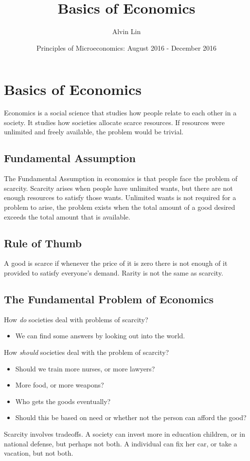 \documentclass[letterpaper, 12pt]{article}
\title{Basics of Economics}
\author{Alvin Lin}
\date{Principles of Microeconomics: August 2016 - December 2016}
\begin{document}
\maketitle

\section*{Basics of Economics}
Economics is a social science that studies how people relate to each other in
a society. It studies how societies allocate scarce resources. If resources were
unlimited and freely available, the problem would be trivial.

\subsection*{Fundamental Assumption}
The Fundamental Assumption in economics is that people face the problem
of scarcity. Scarcity arises when people have unlimited wants, but there are not
enough resources to satisfy those wants. Unlimited wants is not required for
a problem to arise, the problem exists when the total amount of a good desired
exceeds the total amount that is available.

\subsection*{Rule of Thumb}
A good is scarce if whenever the price of it is zero there is not enough of it
provided to satisfy everyone's demand. Rarity is not the same as scarcity.

\subsection*{The Fundamental Problem of Economics}
How \textit{do} societies deal with problems of scarcity?
\begin{itemize}
  \item We can find some answers by looking out into the world.
\end{itemize}
How \textit{should} societies deal with the problem of scarcity?
\begin{itemize}
  \item Should we train more nurses, or more lawyers?
  \item More food, or more weapons?
  \item Who gets the goods eventually?
  \item Should this be based on need or whether not the person can afford the
        good?
\end{itemize}
Scarcity involves tradeoffs. A society can invest more in education children,
or in national defense, but perhaps not both. A individual can fix her car, or
take a vacation, but not both.
\end{document}
